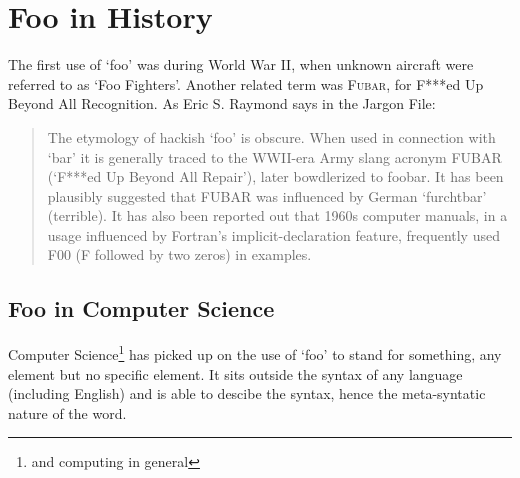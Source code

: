 \documentclass[twoside]{uocthesis}
\begin{document}
\prelimpages

\titlepage

\dedication{To Spiny Norman.}


\tableofcontents


\textpages

\chapter{Foo in History}
\label{sec:hist}
The first use of `foo' was during World War II, when unknown aircraft
were referred to as `Foo Fighters'.
Another related term was \textsc{Fubar}, for F***ed Up Beyond All
Recognition.
As Eric S. Raymond says in the Jargon File\cite{winder2009picking}:
\begin{quote}
  The etymology of hackish `foo' is obscure. When used in connection
  with `bar' it is generally traced to the WWII-era Army slang acronym
  FUBAR (`F***ed Up Beyond All Repair'), later bowdlerized to
  foobar. 
  It has been plausibly suggested that FUBAR  was influenced by German
  `furchtbar' (terrible). 
  It has also been reported out that 1960s computer manuals, in a
  usage influenced by Fortran's implicit-declaration feature,
  frequently used F00 (F followed by two zeros) in examples. 
\end{quote}

\section{Foo in Computer Science}
\label{sec:cosc}
Computer Science\footnote{and computing in general} has picked up on
the use of `foo' to stand for something, any element but no specific
element.
It sits outside the syntax of any language (including English) and is
able to descibe the syntax, hence the meta-syntatic nature of the
word.



\end{document}

